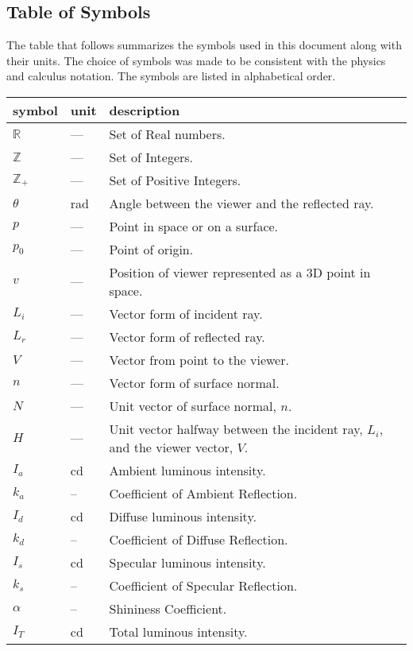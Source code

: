\documentclass[12pt, titlepage]{article}
\begin{document}
\subsection{Table of Symbols}

The table that follows summarizes the symbols used in this document along with
their units.  The choice of symbols was made to be consistent with the physics 
and calculus 
notation. The symbols are listed in alphabetical order.

\renewcommand{\arraystretch}{1.2}
\noindent \begin{longtable*}{l l p{12cm}} \toprule
	\textbf{symbol} & \textbf{unit} & \textbf{description}\\
	\midrule 
	$\mathbb{R}$ & --- & Set of Real numbers.\\
	$\mathbb{Z}$ & --- & Set of Integers.\\
	$\mathbb{Z_{+}}$ & --- & Set of Positive Integers.\\
	$\theta$ & \si[per-mode=symbol] {\radian} & Angle between the viewer and the
	reflected ray.	\\
	$p$ & --- & Point in space or on a surface.
	\\
	$p_{0}$ & --- & Point of origin.
	\\
	$v$ & --- & Position of viewer represented as a 3D point in space.
	\\
	$L_{i}$ & --- & Vector form of incident ray.
	\\
	$L_{r}$ & --- & Vector form of reflected ray.
	\\
	$V$ & --- & Vector from point to the viewer.
	\\
	$n$ & --- & Vector form of surface normal.
	\\
	$N$ & --- & Unit vector of surface normal, $n$.
	\\
	$H$ & --- & Unit vector halfway between the incident ray, $L_{i}$, and
	the viewer vector, $V$.
	\\
	$I_{a}$ & cd & Ambient luminous intensity.
	\\
	$k_{a}$ & -- & Coefficient of Ambient Reflection.
	\\
	$I_{d}$ & cd & Diffuse luminous intensity.
	\\
	$k_{d}$ & -- & Coefficient of Diffuse Reflection.
	\\
	$I_{s}$ & cd & Specular luminous intensity.
	\\
	$k_{s}$ & -- & Coefficient of Specular Reflection.
	\\
	$\alpha$ & -- & Shininess Coefficient.
	\\
	$I_{T}$ & cd & Total luminous intensity.
	\\
	\bottomrule
\end{longtable*}
\end{document}
